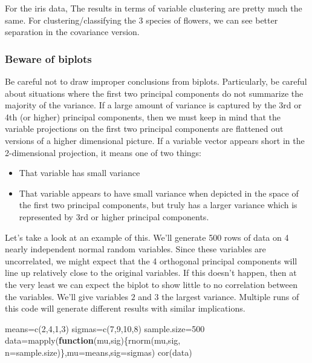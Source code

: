 \documentclass[
]{article}
\newenvironment{Shaded}{\begin{snugshade}}{\end{snugshade}}
\newcommand{\AttributeTok}[1]{\textcolor[rgb]{0.77,0.63,0.00}{#1}}
\newcommand{\ControlFlowTok}[1]{\textcolor[rgb]{0.13,0.29,0.53}{\textbf{#1}}}
\newcommand{\DecValTok}[1]{\textcolor[rgb]{0.00,0.00,0.81}{#1}}
\newcommand{\FunctionTok}[1]{\textcolor[rgb]{0.00,0.00,0.00}{#1}}
\newcommand{\NormalTok}[1]{#1}
\newcommand{\OtherTok}[1]{\textcolor[rgb]{0.56,0.35,0.01}{#1}}
\providecommand{\tightlist}{%
  \setlength{\itemsep}{0pt}\setlength{\parskip}{0pt}}
\theoremstyle{definition}
\theoremstyle{definition}
\theoremstyle{definition}
\theoremstyle{definition}
\theoremstyle{remark}
\begin{document}
For the iris data, The results in terms of variable clustering are pretty much the same. For clustering/classifying the 3 species of flowers, we can see better separation in the covariance version.

\hypertarget{beware-of-biplots}{%
\subsubsection{Beware of biplots}\label{beware-of-biplots}}

Be careful not to draw improper conclusions from biplots. Particularly, be careful about situations where the first two principal components do not summarize the majority of the variance. If a large amount of variance is captured by the 3rd or 4th (or higher) principal components, then we must keep in mind that the variable projections on the first two principal components are flattened out versions of a higher dimensional picture. If a variable vector appears short in the 2-dimensional projection, it means one of two things:

\begin{itemize}
\tightlist
\item
  That variable has small variance
\item
  That variable appears to have small variance when depicted in the space of the first two principal components, but truly has a larger variance which is represented by 3rd or higher principal components.
\end{itemize}

Let's take a look at an example of this. We'll generate 500 rows of data on 4 nearly independent normal random variables. Since these variables are uncorrelated, we might expect that the 4 orthogonal principal components will line up relatively close to the original variables. If this doesn't happen, then at the very least we can expect the biplot to show little to no correlation between the variables. We'll give variables \(2\) and \(3\) the largest variance. Multiple runs of this code will generate different results with similar implications.

\begin{Shaded}
\begin{Highlighting}[]
\NormalTok{means}\OtherTok{=}\FunctionTok{c}\NormalTok{(}\DecValTok{2}\NormalTok{,}\DecValTok{4}\NormalTok{,}\DecValTok{1}\NormalTok{,}\DecValTok{3}\NormalTok{)}
\NormalTok{sigmas}\OtherTok{=}\FunctionTok{c}\NormalTok{(}\DecValTok{7}\NormalTok{,}\DecValTok{9}\NormalTok{,}\DecValTok{10}\NormalTok{,}\DecValTok{8}\NormalTok{)}
\NormalTok{sample.size}\OtherTok{=}\DecValTok{500}
\NormalTok{data}\OtherTok{=}\FunctionTok{mapply}\NormalTok{(}\ControlFlowTok{function}\NormalTok{(mu,sig)\{}\FunctionTok{rnorm}\NormalTok{(mu,sig, }\AttributeTok{n=}\NormalTok{sample.size)\},}\AttributeTok{mu=}\NormalTok{means,}\AttributeTok{sig=}\NormalTok{sigmas)}
\FunctionTok{cor}\NormalTok{(data)}
\end{Highlighting}
\end{Shaded}
\end{document}
